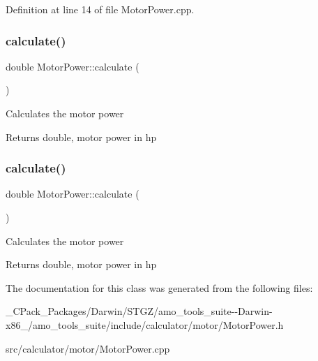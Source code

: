 Definition at line 14 of file Motor\+Power.\+cpp.

\mbox{\label{class_motor_power_a0beab572e5c46a01e474d6403ec81cf4}} 
\subsubsection{\texorpdfstring{calculate()}{calculate()}\hspace{0.1cm}{\footnotesize\ttfamily [2/3]}}
{\footnotesize\ttfamily double Motor\+Power\+::calculate (\begin{DoxyParamCaption}{ }\end{DoxyParamCaption})}

Calculates the motor power \begin{DoxyReturn}{Returns}
double, motor power in hp 
\end{DoxyReturn}
\mbox{\label{class_motor_power_a0beab572e5c46a01e474d6403ec81cf4}} 
\subsubsection{\texorpdfstring{calculate()}{calculate()}\hspace{0.1cm}{\footnotesize\ttfamily [3/3]}}
{\footnotesize\ttfamily double Motor\+Power\+::calculate (\begin{DoxyParamCaption}{ }\end{DoxyParamCaption})}

Calculates the motor power \begin{DoxyReturn}{Returns}
double, motor power in hp 
\end{DoxyReturn}


The documentation for this class was generated from the following files\+:\begin{DoxyCompactItemize}
\item 
\+\_\+\+C\+Pack\+\_\+\+Packages/\+Darwin/\+S\+T\+G\+Z/amo\+\_\+tools\+\_\+suite-\/-\/\+Darwin-\/x86\+\_/amo\+\_\+tools\+\_\+suite/include/calculator/motor/Motor\+Power.\+h\item 
src/calculator/motor/Motor\+Power.\+cpp\end{DoxyCompactItemize}
